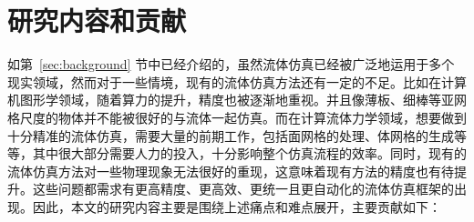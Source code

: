 \section{研究内容和贡献}
如第~\ref{sec:background} 节中已经介绍的，虽然流体仿真已经被广泛地运用于多个现实领域，然而对于一些情境，现有的流体仿真方法还有一定的不足。比如在计算机图形学领域，随着算力的提升，精度也被逐渐地重视。并且像薄板、细棒等亚网格尺度的物体并不能被很好的与流体一起仿真。而在计算流体力学领域，想要做到十分精准的流体仿真，需要大量的前期工作，包括面网格的处理、体网格的生成等等，其中很大部分需要人力的投入，十分影响整个仿真流程的效率。同时，现有的流体仿真方法对一些物理现象无法很好的重现，这意味着现有方法的精度也有待提升。这些问题都需求有更高精度、更高效、更统一且更自动化的流体仿真框架的出现。因此，本文的研究内容主要是围绕上述痛点和难点展开，主要贡献如下：


